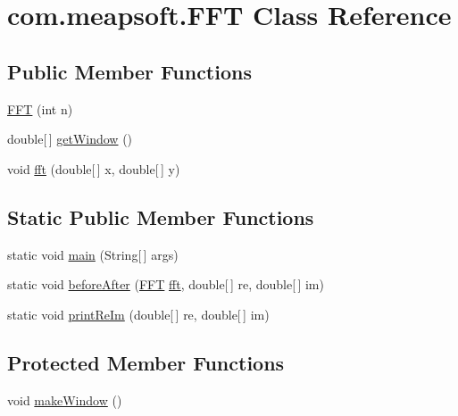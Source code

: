 \hypertarget{classcom_1_1meapsoft_1_1_f_f_t}{}\section{com.\+meapsoft.\+F\+F\+T Class Reference}
\label{classcom_1_1meapsoft_1_1_f_f_t}
\subsection*{Public Member Functions}
\begin{DoxyCompactItemize}
\item 
\hyperlink{classcom_1_1meapsoft_1_1_f_f_t_a990170267a60d2b3aba84f70e8e5c7ea}{F\+F\+T} (int n)
\item 
double\mbox{[}$\,$\mbox{]} \hyperlink{classcom_1_1meapsoft_1_1_f_f_t_af413c29bd2357219bca424f2a05b12bf}{get\+Window} ()
\item 
void \hyperlink{classcom_1_1meapsoft_1_1_f_f_t_ad4197195f12f8a8c9456bfd35d0af744}{fft} (double\mbox{[}$\,$\mbox{]} x, double\mbox{[}$\,$\mbox{]} y)
\end{DoxyCompactItemize}
\subsection*{Static Public Member Functions}
\begin{DoxyCompactItemize}
\item 
static void \hyperlink{classcom_1_1meapsoft_1_1_f_f_t_a8374dbd7d10762b2d9e32f34249446fe}{main} (String\mbox{[}$\,$\mbox{]} args)
\item 
static void \hyperlink{classcom_1_1meapsoft_1_1_f_f_t_abf0df97b1b2f4fcbed8e02df90a7ea8d}{before\+After} (\hyperlink{classcom_1_1meapsoft_1_1_f_f_t}{F\+F\+T} \hyperlink{classcom_1_1meapsoft_1_1_f_f_t_ad4197195f12f8a8c9456bfd35d0af744}{fft}, double\mbox{[}$\,$\mbox{]} re, double\mbox{[}$\,$\mbox{]} im)
\item 
static void \hyperlink{classcom_1_1meapsoft_1_1_f_f_t_a030c9ef36f9c9aed438c5197e2ef1b93}{print\+Re\+Im} (double\mbox{[}$\,$\mbox{]} re, double\mbox{[}$\,$\mbox{]} im)
\end{DoxyCompactItemize}
\subsection*{Protected Member Functions}
\begin{DoxyCompactItemize}
\item 
void \hyperlink{classcom_1_1meapsoft_1_1_f_f_t_abfb8f38b88da0663d12abe3106df1514}{make\+Window} ()
\end{DoxyCompactItemize}


